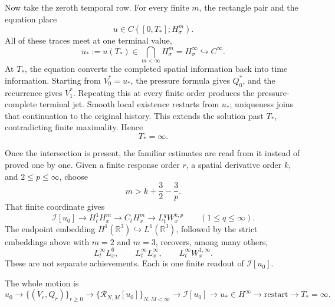 Now take the zeroth temporal row.  For every finite \(m\), the rectangle pair
and the equation place
\[
u\in C([0,T_*];H^m_\sigma).
\]
All of these traces meet at one terminal value,
\[
u_*:=u(T_*)
\in\bigcap_{m<\infty}H^m_\sigma
=H^\infty_\sigma
\hookrightarrow C^\infty.
\]
At \(T_*\), the equation converts the completed spatial information back into
time information.  Starting from \(V_0^*=u_*\), the pressure formula gives
\(Q_0^*\), and the recurrence gives \(V_1^*\).  Repeating this at every finite
order produces the pressure-complete terminal jet.  Smooth local existence
restarts from \(u_*\); uniqueness joins that continuation to the original
history.  This extends the solution past \(T_*\), contradicting finite
maximality.  Hence
\[
T_*=\infty.
\]

Once the intersection is present, the familiar estimates are read from it
instead of proved one by one.  Given a finite response order \(r\), a spatial
derivative order \(k\), and \(2\le p\le\infty\), choose
\[
m>k+\frac32-\frac3p.
\]
That finite coordinate gives
\[
\mathcal I[u_0]
\longrightarrow H_t^1H_x^m
\longrightarrow C_tH_x^m
\longrightarrow L_t^qW_x^{k,p}
\qquad(1\le q\le\infty).
\]
The endpoint embedding \(H^1(\mathbb R^3)\hookrightarrow L^6(\mathbb R^3)\),
followed by the strict embeddings above with \(m=2\) and \(m=3\), recovers,
among many others,
\[
L_t^\infty L_x^6,
\qquad
L_t^\infty L_x^\infty,
\qquad
L_t^\infty W_x^{1,\infty}.
\]
These are not separate achievements.  Each is one finite readout of
\(\mathcal I[u_0]\).

The whole motion is
\[
\boxed{
u_0
\longrightarrow \{(V_r,Q_r)\}_{r\ge0}
\longrightarrow \{\mathcal R_{N,M}[u_0]\}_{N,M<\infty}
\longrightarrow \mathcal I[u_0]
\longrightarrow u_*\in H^\infty
\longrightarrow \text{restart}
\longrightarrow T_*=\infty.
}
\]

\endgroup
